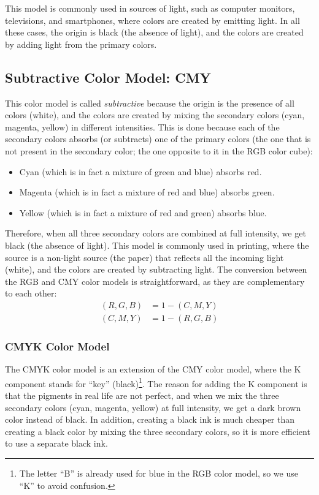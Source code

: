 This model is commonly used in sources of light, such as computer monitors, televisions, and smartphones, where colors are created by emitting light. In all these cases, the origin is black (the absence of light), and the colors are created by adding light from the primary colors.

\subsection{Subtractive Color Model: CMY}

This color model is called \emph{subtractive} because the origin is the presence of all colors (white), and the colors are created by mixing the secondary colors (cyan, magenta, yellow) in different intensities. This is done because each of the secondary colors absorbs (or subtracts) one of the primary colors (the one that is not present in the secondary color; the one opposite to it in the RGB color cube):
\begin{itemize}
    \item Cyan (which is in fact a mixture of green and blue) absorbs red.
    \item Magenta (which is in fact a mixture of red and blue) absorbs green.
    \item Yellow (which is in fact a mixture of red and green) absorbs blue.
\end{itemize}

Therefore, when all three secondary colors are combined at full intensity, we get black (the absence of light). This model is commonly used in printing, where the source is a non-light source (the paper) that reflects all the incoming light (white), and the colors are created by subtracting light. The conversion between the RGB and CMY color models is straightforward, as they are complementary to each other:
\begin{align*}
    (R, G, B) &= 1 - (C, M, Y) \\
    (C, M, Y) &= 1 - (R, G, B)
\end{align*}

\subsubsection{CMYK Color Model}

The CMYK color model is an extension of the CMY color model, where the K component stands for ``key'' (black)\footnote{The letter ``B'' is already used for blue in the RGB color model, so we use ``K'' to avoid confusion.}. The reason for adding the K component is that the pigments in real life are not perfect, and when we mix the three secondary colors (cyan, magenta, yellow) at full intensity, we get a dark brown color instead of black. In addition, creating a black ink is much cheaper than creating a black color by mixing the three secondary colors, so it is more efficient to use a separate black ink.

